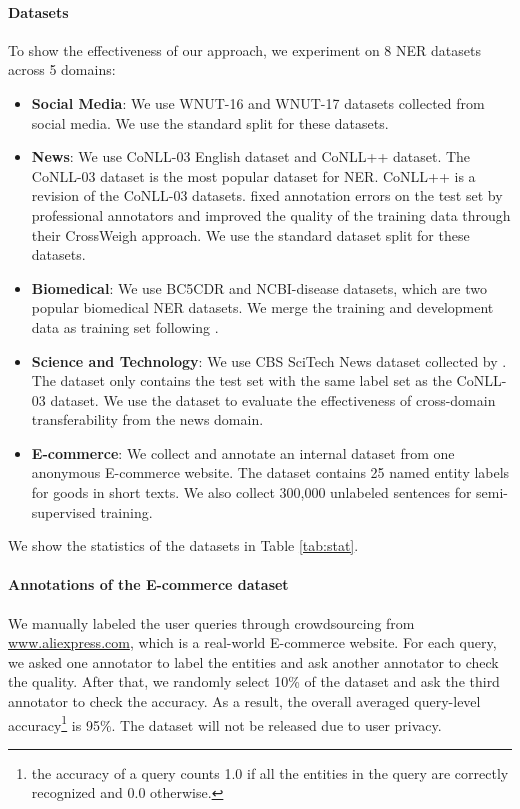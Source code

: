 \documentclass[11pt,a4paper]{article}
\begin{document}
\paragraph{Datasets} To show the effectiveness of our approach, we experiment on 8 NER datasets across 5 domains:
\begin{itemize}[leftmargin=*]
\item {\bf Social Media}: We use WNUT-16 \citep{strauss-etal-2016-results} and WNUT-17 \citep{derczynski-etal-2017-results} datasets collected from social media. We use the standard split for these datasets.
    \item {\bf News}: We use CoNLL-03 English \cite{tjong-kim-sang-de-meulder-2003-introduction} dataset and CoNLL++ \citep{wang-etal-2019-crossweigh} dataset. The CoNLL-03 dataset is the most popular dataset for NER. CoNLL++ is a revision of the CoNLL-03 datasets. \citet{wang-etal-2019-crossweigh} fixed annotation errors on the test set by professional annotators and improved the quality of the training data through their CrossWeigh approach. We use the standard dataset split for these datasets.
    \item {\bf Biomedical}: We use BC5CDR \citep{li2016biocreative} and NCBI-disease \citep{dougan2014ncbi} datasets, which are two popular biomedical NER datasets. We merge the training and development data as training set following \citet{nooralahzadeh-etal-2019-reinforcement}.
    \item {\bf Science and Technology}: We use CBS SciTech News dataset collected by \citet{jia-etal-2019-cross}. The dataset only contains the test set with the same label set as the CoNLL-03 dataset. We use the dataset to evaluate the effectiveness of cross-domain transferability from the news domain.
    \item {\bf E-commerce}: We collect and annotate an internal dataset from one anonymous E-commerce website. The dataset contains 25 named entity labels for goods in short texts. We also collect 300,000 unlabeled sentences for semi-supervised training.
\end{itemize}
We show the statistics of the datasets in Table \ref{tab:stat}.

\paragraph{Annotations of the E-commerce dataset}
We manually labeled the user queries through crowdsourcing from \url{www.aliexpress.com}, which is a real-world E-commerce website. For each query, we asked one annotator to label the entities and ask another annotator to check the quality. After that, we randomly select 10\% of the dataset and ask the third annotator to check the accuracy. As a result, the overall averaged query-level accuracy\footnote{the accuracy of a query counts 1.0 if all the entities in the query are correctly recognized and 0.0 otherwise.} is 95\%. The dataset will not be released due to user privacy.
\end{document}
